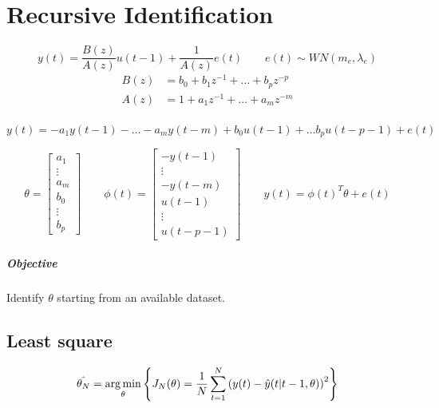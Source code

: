 \chapter{Recursive Identification}

\begin{recall}
    \[
        y(t) = \frac{B(z)}{A(z)}u(t-1) + \frac{1}{A(z)}e(t) \qquad e(t) \sim WN(m_e, \lambda_e)
    \]
    \begin{align*}
        B(z) &= b_0 + b_1z^{-1} + \ldots + b_pz^{-p} \\
        A(z) &= 1 + a_1z^{-1} + \ldots + a_mz^{-m} \\
    \end{align*}

    \[
        y(t) = -a_1y(t-1) - \ldots - a_my(t-m) + b_0u(t-1) + \ldots b_pu(t-p-1) + e(t)
    \]

    \[
        \theta = \begin{bmatrix}
            a_1 \\ \vdots \\ a_m \\
            b_0 \\ \vdots \\ b_p
        \end{bmatrix} \qquad
        \phi(t) = \begin{bmatrix}
            -y(t-1) \\ \vdots \\ -y(t-m) \\
            u(t-1) \\ \vdots \\ u(t-p-1)
        \end{bmatrix}
        \qquad
        y(t) = \phi(t)^T\theta+e(t)
    \]

    \paragraph{Objective} Identify $\theta$ starting from an available dataset.
\end{recall}

\section{Least square}

\[
    \hat{\theta_N} = \operatorname*{arg\,min}_\theta \left\{ J_N(\theta) = \frac{1}{N} \sum_{t=1}^N \left( y(t) - \hat{y}(t|t-1, \theta) \right)^2 \right\}
\]

